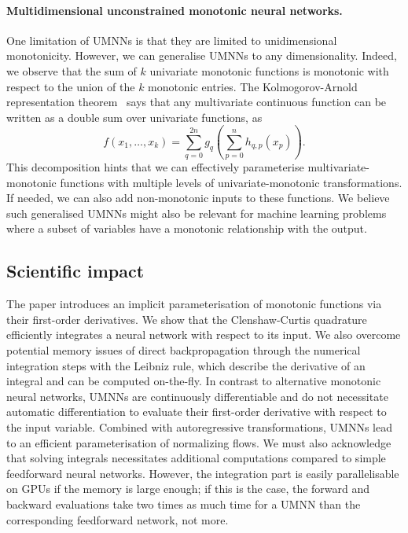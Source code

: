 \paragraph{Multidimensional unconstrained monotonic neural networks.}
One limitation of UMNNs is that they are limited to unidimensional monotonicity. However, we can generalise UMNNs to any dimensionality. Indeed, we observe that the sum of $k$ univariate monotonic functions is monotonic with respect to the union of the $k$ monotonic entries. The Kolmogorov-Arnold representation theorem~\citep{kolmogorov1956representation, arnold2009functions} says that any multivariate continuous function can be written as a double sum over univariate functions, as
$$ f(x_1, \dots, x_k) = \sum_{q=0}^{2n}g_q\left( \sum_{p=0}^{n} h_{q,p}(x_p) \right). $$
This decomposition hints that we can effectively parameterise multivariate-monotonic functions with multiple levels of univariate-monotonic transformations. If needed, we can also add non-monotonic inputs to these functions. We believe such generalised UMNNs might also be relevant for machine learning problems where a subset of variables have a monotonic relationship with the output.

\subsection{Scientific impact}
The paper introduces an implicit parameterisation of monotonic functions via their first-order derivatives. We show that the Clenshaw-Curtis quadrature efficiently integrates a neural network with respect to its input. We also overcome potential memory issues of direct backpropagation through the numerical integration steps with the Leibniz rule, which describe the derivative of an integral and can be computed on-the-fly. In contrast to alternative monotonic neural networks, UMNNs are continuously differentiable and do not necessitate automatic differentiation to evaluate their first-order derivative with respect to the input variable. Combined with autoregressive transformations, UMNNs lead to an efficient parameterisation of normalizing flows. We must also acknowledge that solving integrals necessitates additional computations compared to simple feedforward neural networks. However, the integration part is easily parallelisable on GPUs if the memory is large enough; if this is the case, the forward and backward evaluations take two times as much time for a UMNN than the corresponding feedforward network, not more.

